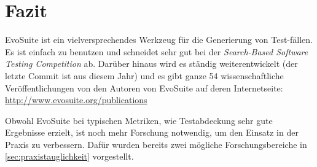 \documentclass[a4paper,11pt]{article}
\begin{document}
\section{Fazit}

EvoSuite ist ein vielversprechendes Werkzeug für die Generierung von Test-fällen.
Es ist einfach zu benutzen und schneidet sehr gut bei der \textit{Search-Based Software Testing Competition} ab.
Darüber hinaus wird es ständig weiterentwickelt (der letzte Commit ist aus diesem Jahr) und es gibt ganze 54 wissenschaftliche Veröffentlichungen von den Autoren von EvoSuite auf deren Internetseite: \url{http://www.evosuite.org/publications}

Obwohl EvoSuite bei typischen Metriken, wie Testabdeckung sehr gute Ergebnisse erzielt, ist noch mehr Forschung notwendig, um den Einsatz in der Praxis zu verbessern.
Dafür wurden bereits zwei mögliche Forschungsbereiche in \cref{sec:praxistauglichkeit} vorgestellt.



\end{document}
